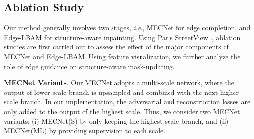 \documentclass[10pt,journal,compsoc]{IEEEtran}
\newcommand{\ie}{\textit{i}.\textit{e}.}
\begin{document}
\subsection{Ablation Study}\label{ablationstudy}
%
Our method generally involves two stages, \ie, MECNet for edge completion, and Edge-LBAM for structure-aware inpainting.
%
Using Paris StreetView~\cite{doersch2015makes}, ablation studies are first carried out to assess the effect of the major components of MECNet and Edge-LBAM.
%
Using feature visualization, we further analyze the role of edge guidance on structure-aware mask-updating.



{\textbf{MECNet Variants}.}
%
Our MECNet adopts a multi-scale network, where the output of lower scale branch is upsampled and combined with the next higher-scale branch.
%
In our implementation, the adversarial and reconstruction losses are only added to the output of the highest scale.
%
Thus, we consider two MECNet variants: (i) MECNet(S) by only keeping the highest-scale branch, and (ii) MECNet(ML) by providing supervision to each scale.
\end{document}
